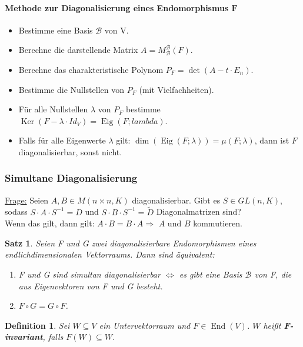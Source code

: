 \documentclass[12pt,a4paper]{article}
\theoremstyle{plain}
\newtheorem{Satz}[Theorem]{Satz}
\newtheorem{Definition}[Theorem]{Definition}
\newcommand{\herv}[1]{{\emph{\textbf{#1}}}}
\numberwithin{equation}{section}
\begin{document}
\paragraph{Methode zur Diagonalisierung eines Endomorphismus $\mathbf{F}$}
\begin{itemize}
\item Bestimme eine Basis $\mathcal{B}$ von V.
\item Berechne die darstellende Matrix $A=M^\mathcal{B}_\mathcal{B}(F)$.
\item Berechne das charakteristische Polynom $P_F=\det(A-t\cdot E_n)$.
\item Bestimme die Nullstellen von $P_F$ (mit Vielfachheiten).
\item Für alle Nullstellen $\lambda$ von $P_F$ bestimme $\operatorname{Ker}(F-\lambda\cdot Id_V)=\operatorname{Eig}(F;lambda)$.
\item Falls für alle Eigenwerte $\lambda$ gilt: $\dim(\operatorname{Eig}(F;\lambda))=\mu(F;\lambda)$, dann ist $F$ diagonalisierbar, sonst nicht.
\end{itemize}
\subsubsection{Simultane Diagonalisierung}
\underline{Frage:} Seien $A,B\in M(n\times n,K)$ diagonalisierbar. Gibt es $S\in GL(n,K)$, sodass $S\cdot A\cdot S^{-1}=D$ und $S\cdot B \cdot S^{-1}=\tilde{D}$ Diagonalmatrizen sind?\\
Wenn das gilt, dann gilt: $A\cdot B = B\cdot A \Rightarrow$ $A$ und $B$ kommutieren.
\begin{Satz}
Seien F und G zwei diagonalisierbare Endomorphismen eines endlichdimensionalen Vektorraums. Dann sind äquivalent:
\begin{enumerate}
\renewcommand{\labelenumi}{\emph{\roman{enumi})}}
\item F und G sind simultan diagonalisierbar $\Leftrightarrow$ es gibt eine Basis $\mathcal{B}$ von F, die aus Eigenvektoren von F und G besteht.
\item $F \circ G= G\circ F$.
\end{enumerate}
\end{Satz}
\begin{Definition}
Sei $W\subseteq V$ ein Untervektorraum und $F\in\operatorname{End}(V)$. $W$ heißt \herv{F-invariant}, falls $F(W)\subseteq W$.
\end{Definition}
\end{document}
